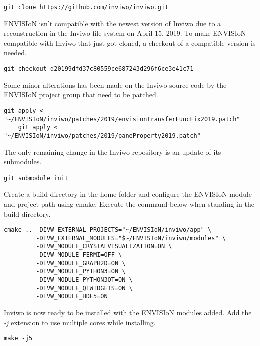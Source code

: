 \begin{lstlisting}[frame = single, breaklines = true]
    git clone https://github.com/inviwo/inviwo.git
\end{lstlisting}

ENVISIoN isn't compatible with the newest version of Inviwo due to a reconstruction in the Inviwo file system on April 15, 2019. To make ENVISIoN compatible with Inviwo that just got cloned, a checkout of a compatible version is needed.

\begin{lstlisting}[frame = single, breaklines = true]
    git checkout d20199dfd37c80559ce687243d296f6ce3e41c71
\end{lstlisting}

Some minor alterations has been made on the Inviwo source code by the ENVISIoN project group that need to be patched. 

\begin{lstlisting}[frame = single, breaklines = true]
    git apply < "~/ENVISIoN/inviwo/patches/2019/envisionTransferFuncFix2019.patch"
    git apply < "~/ENVISIoN/inviwo/patches/2019/paneProperty2019.patch"
\end{lstlisting}

The only remaining change in the Inviwo repository is an update of its submodules.
 
\begin{lstlisting}[frame = single, breaklines = true]
    git submodule init
\end{lstlisting}

Create a build directory in the home folder and configure the ENVISIoN module and project path using cmake. Execute the command below when standing in the build directory. 

\begin{lstlisting}[frame = single, breaklines = true]
    cmake .. -DIVW_EXTERNAL_PROJECTS="~/ENVISIoN/inviwo/app" \
         -DIVW_EXTERNAL_MODULES="$~/ENVISIoN/inviwo/modules" \
         -DIVW_MODULE_CRYSTALVISUALIZATION=ON \
         -DIVW_MODULE_FERMI=OFF \
         -DIVW_MODULE_GRAPH2D=ON \
         -DIVW_MODULE_PYTHON3=ON \
         -DIVW_MODULE_PYTHON3QT=ON \
         -DIVW_MODULE_QTWIDGETS=ON \
         -DIVW_MODULE_HDF5=ON
\end{lstlisting}

Inviwo is now ready to be installed with the ENVISIoN modules added. Add the \emph{-j} extension to use multiple cores while installing.
\begin{lstlisting}[frame = single, breaklines = true]
    make -j5
\end{lstlisting}